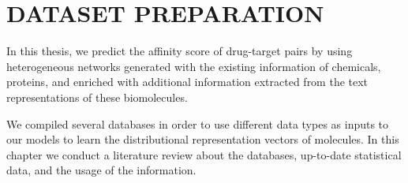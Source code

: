 \chapter{DATASET PREPARATION}
\label{chapter:dataset_preparation}

In this thesis, we predict the affinity score of drug-target pairs by using heterogeneous networks generated with the existing information of chemicals, proteins, and enriched with additional information extracted from the text representations of these biomolecules.

We compiled several databases in order to use different data types as inputs to our models to learn the distributional representation vectors of molecules. In this chapter we conduct a literature review about the databases, up-to-date statistical data, and the usage of the information.











